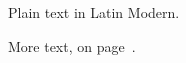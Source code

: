 \documentclass{article}
\begin{document}
Plain text in Latin Modern.\label{lm}

More text, on page~\pageref{lm}.
\end{document}
